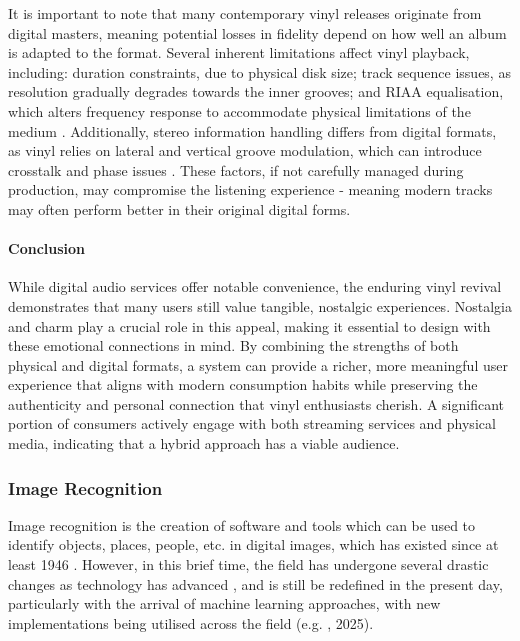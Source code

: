                 It is important to note that many contemporary vinyl releases originate from digital masters, meaning potential losses in fidelity depend on how well an album is adapted to the format. Several inherent limitations affect vinyl playback, including: duration constraints, due to physical disk size; track sequence issues, as resolution gradually degrades towards the inner grooves; and RIAA equalisation, which alters frequency response to accommodate physical limitations of the medium \cite{engineeringvinyls}. Additionally, stereo information handling differs from digital formats, as vinyl relies on lateral and vertical groove modulation, which can introduce crosstalk and phase issues \cite{engineeringvinyls}. These factors, if not carefully managed during production, may compromise the listening experience - meaning modern tracks may often perform better in their original digital forms.
    
            \paragraph{Conclusion}
                While digital audio services offer notable convenience, the enduring vinyl revival demonstrates that many users still value tangible, nostalgic experiences. Nostalgia and charm play a crucial role in this appeal, making it essential to design with these emotional connections in mind. By combining the strengths of both physical and digital formats, a system can provide a richer, more meaningful user experience that aligns with modern consumption habits while preserving the authenticity and personal connection that vinyl enthusiasts cherish. A significant portion of consumers actively engage with both streaming services and physical media, indicating that a hybrid approach has a viable audience.
    
        \subsubsection{Image Recognition}
    
    
            Image recognition is the creation of software and tools which can be used to identify objects, places, people, etc. in digital images, which has existed since at least 1946 \cite{hall1979computer}. However, in this brief time, the field has undergone several drastic changes as technology has advanced \cite{imagenetclasscnn}, and is still be redefined in the present day, particularly with the arrival of machine learning approaches, with new implementations being utilised across the field (e.g. \cite{RAMPRASAD2025100556}, 2025).
    
